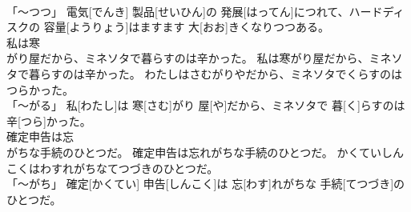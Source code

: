 \documentclass[8pt]{extreport}
\begin{document}
\begin{CJK}{UTF8}{min}
\\	「～つつ」	電気[でんき] 製品[せいひん]の 発展[はってん]につれて、ハードディスクの 容量[ようりょう]はますます 大[おお]きくなりつつある。		
\\	私は寒
\\	がり屋だから、ミネソタで暮らすのは辛かった。	私は寒がり屋だから、ミネソタで暮らすのは辛かった。	わたしはさむがりやだから、ミネソタでくらすのはつらかった。	
\\	「～がる」	私[わたし]は 寒[さむ]がり 屋[や]だから、ミネソタで 暮[く]らすのは 辛[つら]かった。		
\\	確定申告は忘
\\	がちな手続のひとつだ。	確定申告は忘れがちな手続のひとつだ。	かくていしんこくはわすれがちなてつづきのひとつだ。	
\\	「～がち」	確定[かくてい] 申告[しんこく]は 忘[わす]れがちな 手続[てつづき]のひとつだ。		
\end{CJK}
\end{document}
